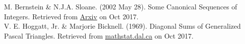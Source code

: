 \documentclass{article}
\begin{document}
\noindent M. Bernstein \& N.J.A. Sloane. (2002 May 28). Some Canonical Sequences of Integers. Retrieved from \href{https://arxiv.org/pdf/math/0205301.pdf}{Arxiv} on Oct 2017.\\

\noindent V. E. Hoggatt, Jr. \& Marjorie Bicknell. (1969). Diagonal Sums of Generalized Pascal Triangles. Retrieved from \href{http://www.mathstat.dal.ca/FQ/Scanned/7-4/hoggatt-a.pdf}{mathstat.dal.ca} on Oct 2017.
\end{document}
